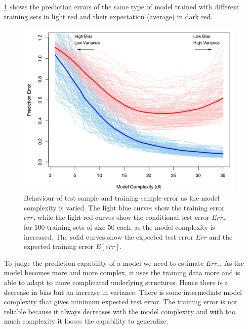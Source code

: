\documentclass[12pt, letterpaper]{article}
\theoremstyle{definition}
\begin{document}
\ref{testErr} shows the prediction errors of the same type of model trained with different training sets in light red and their expectation (average) in dark red.

\begin{figure}
\includegraphics[scale=0.6]{img/testErr}
\caption{Behaviour of test sample and training sample error as the model complexity is varied. The light blue curves show the training error $\bar{err}$, while the light red curves show the conditional test error $Err_\tau$ for $100$ training sets of size $50$ each, as the model complexity is increased. The solid curves show the expected test error $Err$ and the expected training error $E[\bar{err}]$.}
\label{testErr}
\end{figure}
To judge the prediction capability of a model we need to estimate $Err_\tau$. As the model becomes more and more complex, it uses the training data more and is able to adapt to more complicated underlying structures. Hence there is a decrease in bias but an increase in variance. There is some intermediate model complexity that gives minimum expected test error. The training error is not reliable because it always decreases with the model complexity and with too much complexity it looses the capability to generalize.
\end{document}

